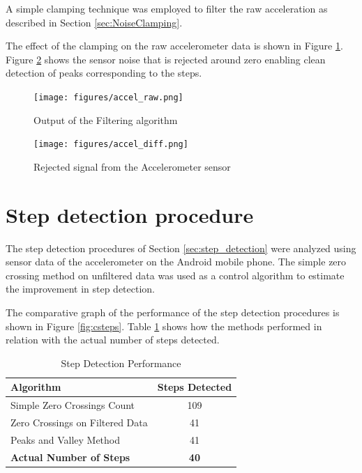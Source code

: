 A simple clamping technique was employed to filter the
raw acceleration as described in Section \ref{sec:NoiseClamping}.

The effect of the clamping on the raw accelerometer data is shown in 
Figure \ref{fig:accel_raw}. Figure \ref{fig:accel_diff} shows the sensor noise
that is rejected around zero enabling clean detection of peaks corresponding to
the steps.

\begin{figure}[tbph]
    \centering
    \texttt{[image: figures/accel\_raw.png]}
    \caption{Output of the Filtering algorithm \label{fig:accel_raw}}
\end{figure}

\begin{figure}[tbph]
    \centering
    \texttt{[image: figures/accel\_diff.png]}
    \caption{Rejected signal from the Accelerometer sensor \label{fig:accel_diff}}
\end{figure}


\section{Step detection procedure}

The step detection procedures of Section \ref{sec:step_detection} were analyzed
using sensor data of the accelerometer on the Android mobile phone. 
The simple zero crossing method on unfiltered data was used as a control 
algorithm to estimate the improvement in step detection.

The comparative graph of the performance of the step detection procedures 
is shown in Figure \ref{fig:csteps}. Table \ref{tbl:step_table} shows how the 
methods performed in relation with the actual number of steps detected.


\begin{table}[tbph]
\centering
\begin{tabular}{||l|c||}
\hline
\hline
\textbf{Algorithm} & \textbf{Steps Detected} \\
\hline

Simple Zero Crossings Count & 109 \\
Zero Crossings on Filtered Data & 41 \\
Peaks and Valley Method & 41 \\
\textbf{Actual Number of Steps} & \textbf{40} \\
\hline
\hline
\end{tabular}
\caption{Step Detection Performance\label{tbl:step_table}}
\end{table}

